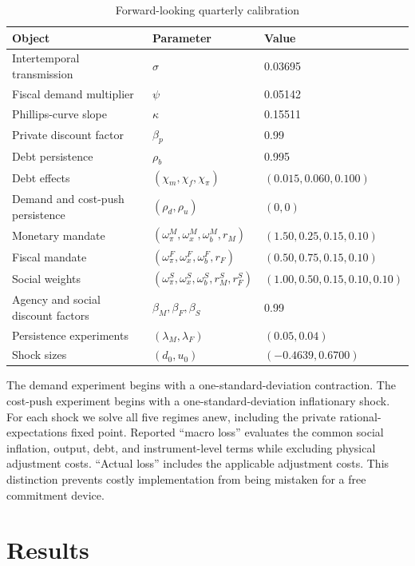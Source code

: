 \documentclass[11pt]{article}
\begin{document}
\begin{table}[H]
\centering
\caption{Forward-looking quarterly calibration}
\label{tab:calibration}
\begin{tabular}{@{}lll@{}}
\toprule
Object & Parameter & Value \\
\midrule
Intertemporal transmission & $\sigma$ & 0.03695 \\
Fiscal demand multiplier & $\psi$ & 0.05142 \\
Phillips-curve slope & $\kappa$ & 0.15511 \\
Private discount factor & $\beta_p$ & 0.99 \\
Debt persistence & $\rho_b$ & 0.995 \\
Debt effects & $(\chi_m,\chi_f,\chi_\pi)$ & $(0.015,0.060,0.100)$ \\
Demand and cost-push persistence & $(\rho_d,\rho_u)$ & $(0,0)$ \\
Monetary mandate & $(\omega^M_\pi,\omega^M_x,\omega^M_b,r_M)$
  & $(1.50,0.25,0.15,0.10)$ \\
Fiscal mandate & $(\omega^F_\pi,\omega^F_x,\omega^F_b,r_F)$
  & $(0.50,0.75,0.15,0.10)$ \\
Social weights & $(\omega^S_\pi,\omega^S_x,\omega^S_b,r^S_M,r^S_F)$
  & $(1.00,0.50,0.15,0.10,0.10)$ \\
Agency and social discount factors & $\beta_M,\beta_F,\beta_S$ & 0.99 \\
Persistence experiments & $(\lambda_M,\lambda_F)$ & $(0.05,0.04)$ \\
Shock sizes & $(d_0,u_0)$ & $(-0.4639,0.6700)$ \\
\bottomrule
\end{tabular}
\end{table}

The demand experiment begins with a one-standard-deviation contraction. The
cost-push experiment begins with a one-standard-deviation inflationary shock.
For each shock we solve all five regimes anew, including the private rational-
expectations fixed point. Reported ``macro loss'' evaluates the common social
inflation, output, debt, and instrument-level terms while excluding physical
adjustment costs. ``Actual loss'' includes the applicable adjustment costs.
This distinction prevents costly implementation from being mistaken for a
free commitment device.

\section{Results}
\label{sec:results}
\end{document}
